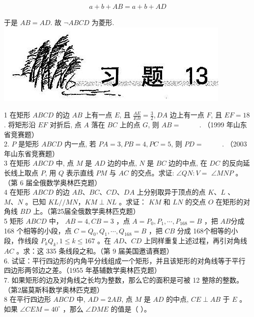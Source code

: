 \documentclass[10pt]{article}
\begin{document}
\begin{align*}
a+b+A B=a+b+A D
\end{align*}

于是 $A B=A D$. 故 $\neg A B C D$ 为菱形.\\
\includegraphics[max width=\textwidth, center]{2024_10_30_2c8f45efd4a519b08e1ag-125}

1 在矩形 $A B C D$ 的边 $A B$ 上有一点 $E$, 且 $\frac{A E}{E B}=\frac{3}{2}, D A$ 边上有一点 $F$, 且 $E F=18$. 将矩形沿 $E F$ 对折后, 点 $A$ 落在 $B C$ 上的点 $G$, 则 $A B=$ $\qquad$ . （1999 年山东省竞赛题）\\
2. $P$ 是矩形 $A B C D$ 内一点, 若 $P A=3, P B=4, P C=5$, 则 $P D=$ $\qquad$ . （2003 年山东省竞赛题）\\
3 在矩形 $A B C D$ 中, 点 $M$ 是 $A D$ 边的中点, $N$ 是 $B C$ 边的中点, 在 $D C$ 的反向延长线上取点 $P$, 用 $Q$ 表示直线 $P M$ 与 $A C$ 的交点。求证: $\angle Q N: V=$ $\angle M N P$ 。（第 6 届全俄数学奥林匹克题）\\
4 在矩形 $A B C D$ 的边 $A B 、 B C 、 C D 、 D A$ 上分别取异于顶点的点 $K 、 L$ 、 $M 、 N$ 。已知 $K L / / M N ， K M \perp N L$ 。求证： $K M$ 和 $L N$ 的交点 $O$ 在矩形的对角线 $B D$ 上。（第25届全俄数学奥林匹克题）\\
5 矩形 $A B C D$ 中， $A B=4, C B=3$ ，点 $A=P_{0}, P_{1}, \cdots, P_{168}=B$ ，把 $A B$分成 168 个相等的小段，点 $C=Q_{0}, Q_{1}, \cdots, Q_{168}=B$ ，把 $C B$ 分成 168个相等的小段，作线段 $P_{k} Q_{k}, 1 \leqslant k \leqslant 167$ 。在 $A D 、 C D$ 上同样重复上述过程，再引对角线 $A C$ 。求：这 335 条线段之和。（第 9 届美国邀请赛题）\\
6. 试证：平行四边形的内角平分线组成一个矩形，并且该矩形的对角线等于平行四边形两邻边之差。（1955 年基辅数学奥林匹克题）\\
7. 如果矩形的边及对角线之长均为整数，那么它的面积是可被 12 整除的整数。（第2届莫斯科数学奥林匹克题）\\
8 在平行四边形 $A B C D$ 中, $A D=2 A B$, 点 $M$ 是 $A D$ 的中点, $C E \perp A B$ 于 $E$ 。如果 $\angle C E M=40^{\circ}$ ，那么 $\angle D M E$ 的值是（ ）。\\
\end{document}
